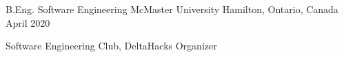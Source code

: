 


\begin{cventries}


\cventry
{B.Eng. Software Engineering} %
{McMaster University} %
{Hamilton, Ontario, Canada} %
{April 2020} %
{ %
\begin{cvitems}
\item {Software Engineering Club, DeltaHacks Organizer}
\end{cvitems}
}


\end{cventries}